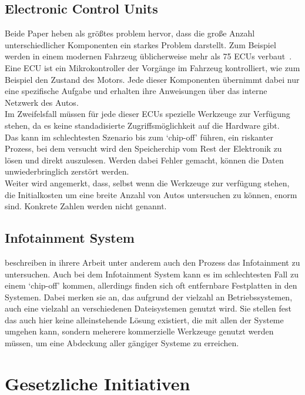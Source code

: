 \documentclass[conference,compsoc,final,a4paper]{IEEEtran}
\begin{document}
\subsection{Electronic Control Units}
Beide Paper heben als größtes problem hervor, dass die große Anzahl unterschiedlicher Komponenten ein starkes Problem darstellt.
Zum Beispiel werden in einem modernen Fahrzeug üblicherweise mehr als 75 \ac{ECU}s verbaut~\cite{Stopka_2019}.
Eine \ac{ECU} ist ein Mikrokontroller der Vorgänge im Fahrzeug kontrolliert, wie zum Beispiel den Zustand des Motors. Jede dieser
Komponenten übernimmt dabei nur eine spezifische Aufgabe und erhalten ihre Anweisungen über das interne Netzwerk des Autos.\\
Im Zweifelsfall müssen für jede dieser \ac{ECU}s spezielle Werkzeuge zur Verfügung stehen, da es keine standadisierte Zugriffsmöglichkeit
auf die Hardware gibt.\\
Das kann im schlechtesten Szenario bis zum `chip-off' führen, ein riskanter Prozess, bei dem versucht wird den Speicherchip vom Rest der Elektronik
zu lösen und direkt auszulesen.
Werden dabei Fehler gemacht, können die Daten unwiederbringlich zerstört werden.\\
Weiter wird angemerkt, dass, selbst wenn die Werkzeuge zur verfügung stehen, die Initialkosten um eine breite Anzahl von Autos untersuchen zu können,
enorm sind. Konkrete Zahlen werden nicht genannt.\\

\subsection{Infotainment System}
 beschreiben in ihrere Arbeit unter anderem auch den Prozess das Infotainment zu untersuchen.
Auch bei dem Infotainment System kann es im schlechtesten Fall zu einem `chip-off' kommen, allerdings finden sich oft entfernbare Festplatten in den Systemen.
Dabei merken sie an, das aufgrund der vielzahl an Betriebssystemen, auch eine vielzahl an verschiedenen Dateisystemen genutzt wird.
Sie stellen fest das auch hier keine alleinstehende Lösung existiert, die mit allen der Systeme umgehen kann, sondern meherere
kommerzielle Werkzeuge genutzt werden müssen, um eine Abdeckung aller gängiger Systeme zu erreichen.

\section{Gesetzliche Initiativen}
\end{document}
